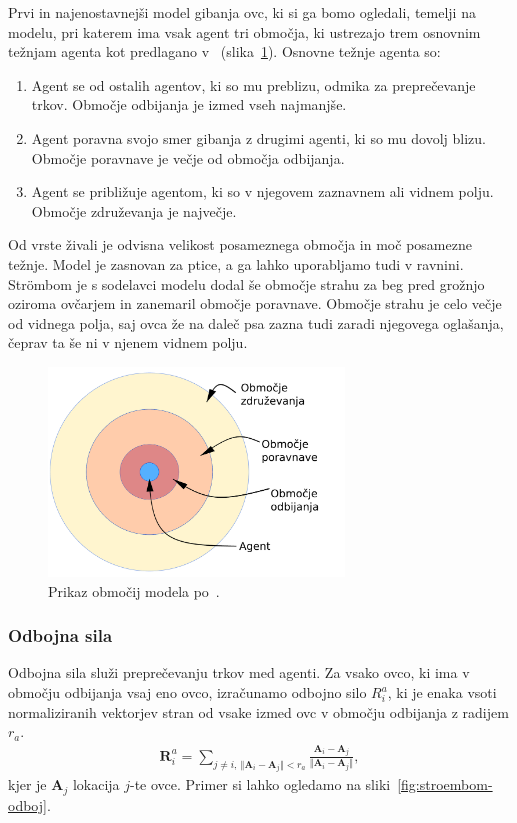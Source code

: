 Prvi in najenostavnejši model gibanja ovc, ki si ga bomo ogledali, temelji na modelu, pri katerem ima vsak agent tri območja, ki ustrezajo trem osnovnim težnjam agenta kot predlagano v~\cite{boids} (slika~\ref{fig:boids}). Osnovne težnje agenta so:
\begin{enumerate}
	\item Agent se od ostalih agentov, ki so mu preblizu, odmika za preprečevanje trkov. Območje odbijanja je izmed vseh najmanjše.
	\item Agent poravna svojo smer gibanja z drugimi agenti, ki so mu dovolj blizu. Območje poravnave je večje od območja odbijanja.
	\item Agent se približuje agentom, ki so v njegovem zaznavnem ali vidnem polju. Območje združevanja je največje.
\end{enumerate}
Od vrste živali je odvisna velikost posameznega območja in moč posamezne težnje. Model je zasnovan za ptice, a ga lahko uporabljamo tudi v ravnini. Str{\"o}mbom je s sodelavci modelu dodal še območje strahu za beg pred grožnjo oziroma ovčarjem in zanemaril območje poravnave. Območje strahu je celo večje od vidnega polja, saj ovca že na daleč psa zazna tudi zaradi njegovega oglašanja, čeprav ta še ni v njenem vidnem polju.

\begin{figure}[ht]  %
	\centering
	\includegraphics[width=0.7\textwidth]{../poglavja/images/boids.pdf}
	\caption[Območja zaznave]{Prikaz območij modela po~\cite{boids}.} %
	\label{fig:boids}
\end{figure}

\subsubsection{Odbojna sila}

Odbojna sila služi preprečevanju trkov med agenti. Za vsako ovco, ki ima v območju odbijanja vsaj eno ovco, izračunamo odbojno silo $R_i^a$, ki je enaka vsoti normaliziranih vektorjev stran od vsake izmed ovc v območju odbijanja z radijem $r_a$.
\begin{align}
\mathbf{R}_i^a = \sum_{j\not=i,~\Vert \mathbf{A}_i - \mathbf{A}_j\Vert < r_a}\frac{ \mathbf{A}_i - \mathbf{A}_j}{\Vert \mathbf{A}_i - \mathbf{A}_j\Vert}, \label{eq:stroembom-odboj}
\end{align}
kjer je $\mathbf{A}_j$ lokacija $j$-te ovce. Primer si lahko ogledamo na sliki~\ref{fig:stroembom-odboj}.

